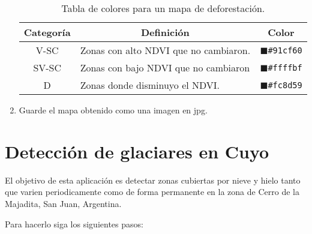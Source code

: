 \begin{enumerate}
\begin{table}[]
\centering
\begin{tabular}{@{}cll@{}}
\toprule
Categoría & \multicolumn{1}{c}{Definición}        & \multicolumn{1}{c}{Color}          \\ \midrule
V-SC      & Zonas con alto NDVI que no cambiaron. & \textcolor{P1}{$\blacksquare$}\texttt{\#91cf60} \\
SV-SC     & Zonas con bajo NDVI que no cambiaron  & \textcolor{P2}{$\blacksquare$}\texttt{\#ffffbf} \\
D         & Zonas donde disminuyo el NDVI.        & \textcolor{P3}{$\blacksquare$}\texttt{\#fc8d59} \\ \bottomrule
\end{tabular}
\caption{Tabla de colores para un mapa de deforestación.}
\label{tab:def}
\end{table}

\item Guarde el mapa obtenido como una imagen en jpg.

\end{enumerate}

\section{Detección de glaciares en Cuyo}

El objetivo de esta aplicación es detectar zonas cubiertas por nieve y hielo tanto que varien periodicamente como de forma permanente en la zona de Cerro de la Majadita, San Juan, Argentina.

Para hacerlo siga los siguientes pasos:

